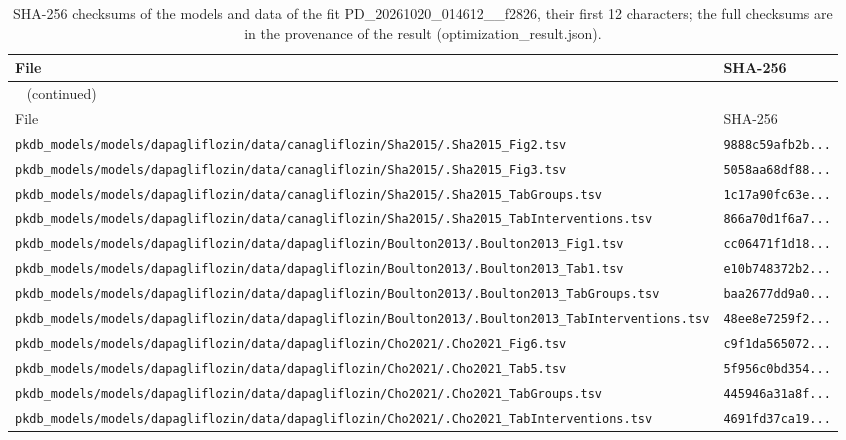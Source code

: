 \begin{longtable}{ll}
\caption{SHA-256 checksums of the models and data of the fit PD\_20261020\_014612\_\_f2826, their first 12 characters; the full checksums are in the provenance of the result (optimization\_result.json).}\label{tab:checksums:PD_20261020_014612__f2826} \\
\toprule
File & SHA-256 \\
\midrule
\endfirsthead
\multicolumn{2}{l}{\small\tablename~\thetable{} (continued)} \\
\toprule
File & SHA-256 \\
\midrule
\endhead
\bottomrule
\endlastfoot
\texttt{pkdb\_models/models/dapagliflozin/data/canagliflozin/Sha2015/.Sha2015\_Fig2.tsv} & \texttt{9888c59afb2b...} \\
\texttt{pkdb\_models/models/dapagliflozin/data/canagliflozin/Sha2015/.Sha2015\_Fig3.tsv} & \texttt{5058aa68df88...} \\
\texttt{pkdb\_models/models/dapagliflozin/data/canagliflozin/Sha2015/.Sha2015\_TabGroups.tsv} & \texttt{1c17a90fc63e...} \\
\texttt{pkdb\_models/models/dapagliflozin/data/canagliflozin/Sha2015/.Sha2015\_TabInterventions.tsv} & \texttt{866a70d1f6a7...} \\
\texttt{pkdb\_models/models/dapagliflozin/data/dapagliflozin/Boulton2013/.Boulton2013\_Fig1.tsv} & \texttt{cc06471f1d18...} \\
\texttt{pkdb\_models/models/dapagliflozin/data/dapagliflozin/Boulton2013/.Boulton2013\_Tab1.tsv} & \texttt{e10b748372b2...} \\
\texttt{pkdb\_models/models/dapagliflozin/data/dapagliflozin/Boulton2013/.Boulton2013\_TabGroups.tsv} & \texttt{baa2677dd9a0...} \\
\texttt{pkdb\_models/models/dapagliflozin/data/dapagliflozin/Boulton2013/.Boulton2013\_TabInterventions.tsv} & \texttt{48ee8e7259f2...} \\
\texttt{pkdb\_models/models/dapagliflozin/data/dapagliflozin/Cho2021/.Cho2021\_Fig6.tsv} & \texttt{c9f1da565072...} \\
\texttt{pkdb\_models/models/dapagliflozin/data/dapagliflozin/Cho2021/.Cho2021\_Tab5.tsv} & \texttt{5f956c0bd354...} \\
\texttt{pkdb\_models/models/dapagliflozin/data/dapagliflozin/Cho2021/.Cho2021\_TabGroups.tsv} & \texttt{445946a31a8f...} \\
\texttt{pkdb\_models/models/dapagliflozin/data/dapagliflozin/Cho2021/.Cho2021\_TabInterventions.tsv} & \texttt{4691fd37ca19...} \\

\end{longtable}
